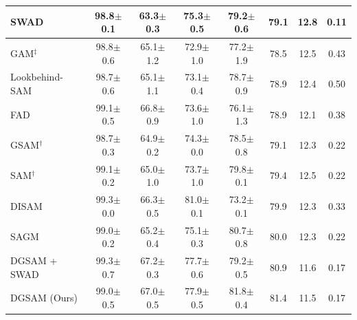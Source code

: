 \documentclass{article}
\theoremstyle{plain}
\theoremstyle{definition}
\theoremstyle{remark}
\begin{document}
\begin{table}[!ht]
\begin{tabular}{l|cccc|ccc}
SWAD \cite{cha2021swad}         & {98.8\scriptsize$\pm$0.1} & {63.3\scriptsize$\pm$0.3} & {75.3\scriptsize$\pm$0.5} & {79.2\scriptsize$\pm$0.6} & 79.1 & 12.8 & 0.11 \\ \midrule
GAM\(^\ddag\) \cite{zhang2023gam}         & {98.8\scriptsize$\pm$0.6} & {65.1\scriptsize$\pm$1.2} & {72.9\scriptsize$\pm$1.0} & {77.2\scriptsize$\pm$1.9} & 78.5 & 12.5 & 0.43 \\
Lookbehind-SAM \cite{mordido2024lookbehind}         & {98.7\scriptsize$\pm$0.6} & {65.1\scriptsize$\pm$1.1} & {73.1\scriptsize$\pm$0.4} & {78.7\scriptsize$\pm$0.9} & 78.9 & 12.4 & 0.50 \\
FAD \cite{zhang2023fad}         & {99.1\scriptsize$\pm$0.5} & {66.8\scriptsize$\pm$0.9} & {73.6\scriptsize$\pm$1.0} & {76.1\scriptsize$\pm$1.3} & 78.9 & 12.1 & 0.38 \\
GSAM\(^\dag\) \cite{zhuang2022gsam}         & {98.7\scriptsize$\pm$0.3} & {64.9\scriptsize$\pm$0.2} & {74.3\scriptsize$\pm$0.0} & {78.5\scriptsize$\pm$0.8} & 79.1 & 12.3 & 0.22 \\
SAM\(^\dag\) \cite{foret2021sam}         & {99.1\scriptsize$\pm$0.2} & {65.0\scriptsize$\pm$1.0} & {73.7\scriptsize$\pm$1.0} & {79.8\scriptsize$\pm$0.1} & 79.4 & 12.5 & 0.22 \\
DISAM \cite{zhang2024disam}         & {99.3\scriptsize$\pm$0.0} & {66.3\scriptsize$\pm$0.5} & {81.0\scriptsize$\pm$0.1} & {73.2\scriptsize$\pm$0.1} & 79.9 & 12.3 & 0.33 \\
SAGM \cite{wang2023sagm}         & {99.0\scriptsize$\pm$0.2} & {65.2\scriptsize$\pm$0.4} & {75.1\scriptsize$\pm$0.3} & {80.7\scriptsize$\pm$0.8} & 80.0 & 12.3 & 0.22 \\
DGSAM + SWAD          & {99.3\scriptsize$\pm$0.7} & {67.2\scriptsize$\pm$0.3} & {77.7\scriptsize$\pm$0.6} & {79.2\scriptsize$\pm$0.5} & 80.9 & 11.6 & 0.17 \\
DGSAM (Ours)         & {99.0\scriptsize$\pm$0.5} & {67.0\scriptsize$\pm$0.5} & {77.9\scriptsize$\pm$0.5} & {81.8\scriptsize$\pm$0.4} & 81.4 & 11.5 & 0.17 \\\bottomrule
\end{tabular}
\end{table}
\end{document}
